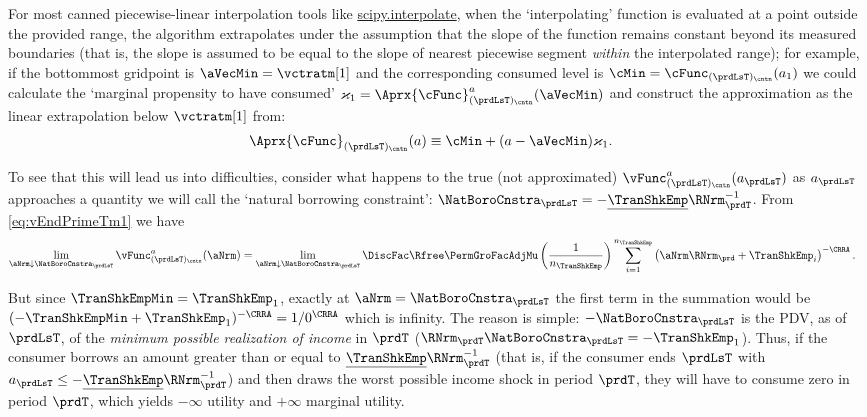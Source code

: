 \documentclass[\econtexRoot/SolvingMicroDSOPs]{subfiles}
\begin{document}
For most canned piecewise-linear interpolation tools like \href{https://docs.scipy.org/doc/scipy/tutorial/interpolate.html}{scipy.interpolate}, when the `interpolating' function is evaluated at a point outside the provided range, the algorithm extrapolates under the assumption that the slope of the function remains constant beyond its measured boundaries (that is, the slope is assumed to be equal to the slope of nearest piecewise segment \emph{within} the interpolated range); for example, if the bottommost gridpoint is $\aVecMin = \vctratm[1]$ and the corresponding consumed level is $\cMin = \cFunc_{({\prdLsT})_\cntn}(a_1)$ we could calculate the `marginal propensity to have consumed' $\varkappa_{1}=
\Aprx{\cFunc}_{({\prdLsT})_\cntn}^{{a}}(\aVecMin)$ and construct the approximation as the linear extrapolation below $\vctratm[1]$ from:
\begin{equation}\begin{gathered}\begin{aligned}
      \Aprx{\cFunc}_{({\prdLsT})_\cntn}({a})  &  \equiv \cMin + ({a}-\aVecMin)\varkappa_{1}  \label{eq:ExtrapLin}.
    \end{aligned}\end{gathered}\end{equation}

To see that this will lead us into difficulties, consider what happens to the true (not approximated) $\vFunc^{{a}}_{({\prdLsT})_\cntn}({a}_{\prdLsT})$ as ${a}_{\prdLsT}$ approaches a quantity we will call the `natural borrowing constraint': $\NatBoroCnstra_{\prdLsT}=-\underline{\TranShkEmp}\RNrm_{\prdT}^{-1}$.  From
\eqref{eq:vEndPrimeTm1} we have
\begin{equation}\begin{gathered}\begin{aligned}
      \lim_{\aNrm \downarrow \NatBoroCnstra_{\prdLsT}} \vFunc^{{a}}_{({\prdLsT})_\cntn}(\aNrm)
      & =                                                                                         \lim_{\aNrm \downarrow \NatBoroCnstra_{\prdLsT}} \DiscFac \Rfree \PermGroFacAdjMu \left(\frac{1}{n_{\TranShkEmp}}\right) \sum_{i=1}^{n_{\TranShkEmp}} \left( \aNrm \RNrm_{\prd}+ \TranShkEmp_{i}\right)^{-\CRRA}.
    \end{aligned}\end{gathered}\end{equation}

But since $\TranShkEmpMin=\TranShkEmp_{1}$, exactly at $\aNrm=\NatBoroCnstra_{\prdLsT}$ the first term in the summation would be $(-\TranShkEmpMin+\TranShkEmp_{1})^{-\CRRA}=1/0^{\CRRA}$ which is infinity.  The reason is simple: $-\NatBoroCnstra_{\prdLsT}$ is the PDV, as of $\prdLsT$, of the \emph{minimum possible realization of income} in $\prdT$ ($\RNrm_{\prdT}\NatBoroCnstra_{\prdLsT} = -\TranShkEmp_{1}$).  Thus, if the consumer borrows an amount greater than or equal to $\underline{\TranShkEmp}\RNrm_{\prdT}^{-1}$ (that is, if the consumer ends $\prdLsT$ with ${a}_{\prdLsT} \leq -\underline{\TranShkEmp}\RNrm_{\prdT}^{-1}$) and then draws the worst possible income shock in period $\prdT$, they will have to consume zero in period $\prdT$, which yields $-\infty$ utility and $+\infty$ marginal utility.
\end{document}

